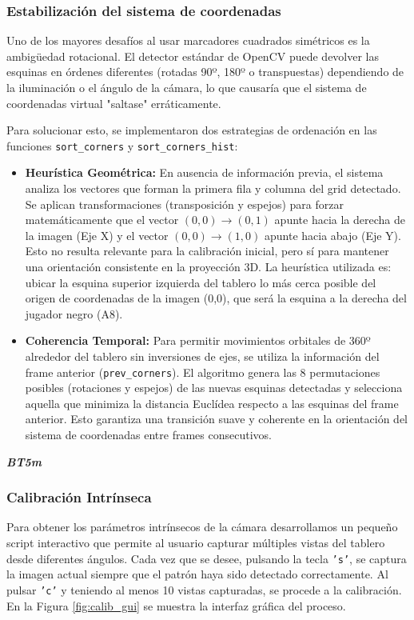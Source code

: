\documentclass[11pt,a4paper]{article}
\begin{document}
\subsubsection{Estabilización del sistema de coordenadas}
Uno de los mayores desafíos al usar marcadores cuadrados simétricos es la ambigüedad rotacional. 
El detector estándar de OpenCV puede devolver las esquinas en órdenes diferentes (rotadas 90º, 180º o transpuestas) 
dependiendo de la iluminación o el ángulo de la cámara, lo que causaría 
que el sistema de coordenadas virtual "saltase" erráticamente.

Para solucionar esto, se implementaron dos estrategias de ordenación en las funciones \texttt{sort\_corners} y \texttt{sort\_corners\_hist}:

\begin{itemize}
    \item \textbf{Heurística Geométrica:} En ausencia de información previa, 
    el sistema analiza los vectores que forman la primera fila y columna del grid detectado. 
    Se aplican transformaciones (transposición y espejos) para forzar matemáticamente que el 
    vector $(0,0) \to (0,1)$ apunte hacia la derecha de la imagen (Eje X) y el vector $(0,0) \to (1,0)$ 
    apunte hacia abajo (Eje Y). Esto no resulta relevante para la calibración inicial, pero
    sí para mantener una orientación consistente en la proyección 3D. La heurística utilizada es:
    ubicar la esquina superior izquierda del tablero lo más cerca posible del origen de coordenadas de la imagen (0,0), 
    que será la esquina a la derecha del jugador negro (A8).
    
    \item \textbf{Coherencia Temporal:} Para permitir movimientos orbitales de 360º alrededor 
    del tablero sin inversiones de ejes, se utiliza la información del frame anterior (\texttt{prev\_corners}). 
    El algoritmo genera las 8 permutaciones posibles (rotaciones y espejos) de las nuevas esquinas detectadas 
    y selecciona aquella que minimiza la distancia Euclídea respecto a las esquinas del frame anterior. 
    Esto garantiza una transición suave y coherente en la orientación del sistema de coordenadas entre frames consecutivos.
\end{itemize}

\textit{\textbf{BT5m}}

\subsubsection{Calibración Intrínseca}
Para obtener los parámetros intrínsecos de la cámara desarrollamos un pequeño script interactivo que permite al 
usuario capturar múltiples vistas del tablero desde diferentes ángulos. Cada vez que se desee, pulsando la tecla 
\texttt{'s'}, se captura la imagen actual siempre que el patrón haya sido detectado correctamente. Al pulsar 
\texttt{'c'} y teniendo al menos 10 vistas capturadas, se procede a la calibración. En la Figura \ref{fig:calib_gui} se muestra la interfaz gráfica del proceso.
\end{document}
